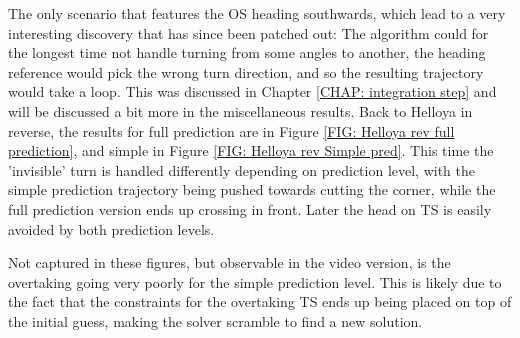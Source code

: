 The only scenario that features the OS heading southwards, which lead to a very interesting discovery that has since been patched out: The algorithm could for the longest
time not handle turning from some angles to another, the heading reference would pick the wrong turn direction, and so the resulting trajectory would take a loop. 
This was discussed in Chapter \ref{CHAP: integration step} and will be discussed a bit more in the miscellaneous results. 
Back to Helloya in reverse, the results for full prediction are in Figure \ref{FIG: Helloya rev full prediction}, 
and simple in Figure \ref{FIG: Helloya rev Simple pred}. This time the 'invisible' turn is handled differently depending on prediction level, with
the simple prediction trajectory being pushed towards cutting the corner, while the full prediction version ends up crossing in front. Later the head on
TS is easily avoided by both prediction levels.

Not captured in these figures, but observable in the video version, is the 
overtaking going very poorly for the simple prediction level. This is likely due to the fact that the
constraints for the overtaking TS ends up being placed on top of the initial guess, making the solver scramble to find a new solution.


